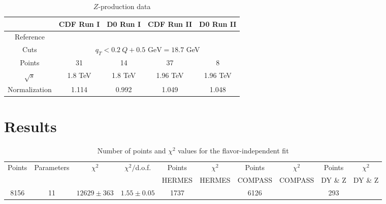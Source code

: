 \documentclass[aps,preprintnumbers,showpacs,nofootinbib,superscriptaddress,floatfix]{revtex4}
\begin{document}
\begin{table}[h]
\begin{center}
\renewcommand{\tabcolsep}{0.4pc} %
\renewcommand{\arraystretch}{1.2} %
\begin{tabular}{|c|c|c|c|c|}
 \hline
 ~                        & CDF Run I    &  D0 Run I        & CDF Run II        & D0 Run II      \\
 \hline
 Reference        &\cite{Affolder:1999jh} &\cite{Abbott:1999wk}&\cite{Aaltonen:2012fi}&\cite{Abazov:2007ac} \\
\hline
Cuts             & \multicolumn{4}{c|}{$q_T< 0.2\ Q +0.5 \text{ GeV}=18.7$ GeV}                                  \\
\hline
 Points                   &      31      &   14             &       37          &        8       \\
 \hline
 $\sqrt{s}$               &      1.8 TeV &   1.8 TeV        &       1.96 TeV    &       1.96 TeV   \\
 \hline
Normalization        &  1.114       &    0.992          &       1.049        &       1.048    \\
\hline
\end{tabular}
\caption{$Z$-production data}
\end{center}
\end{table}

\section{Results}
\label{s:results}

\begin{table}
\small
  \centering
  \begin{tabular}{|c|c|c|c|c|c|c|c|c|c|}
\hline
\hline
Points& Parameters & $\chi^2$& $\chi^2/$d.o.f.& 
                  Points &$\chi^2$& Points &$\chi^2$& Points &$\chi^2$ 
 \\ 
      &    &    &  & HERMES    & HERMES   & COMPASS & COMPASS & DY \& Z & DY \& Z  \\
\hline
8156 & 11  & $12629 \pm 363$ & $1.55 \pm 0.05$ & 1737&  &6126 & & 293 &    \\
\hline
\hline
\end{tabular}
\caption{Number of points and $\chi^2$ values 
for the flavor-independent fit}
\label{t:chi2}
\end{table}
\end{document}
